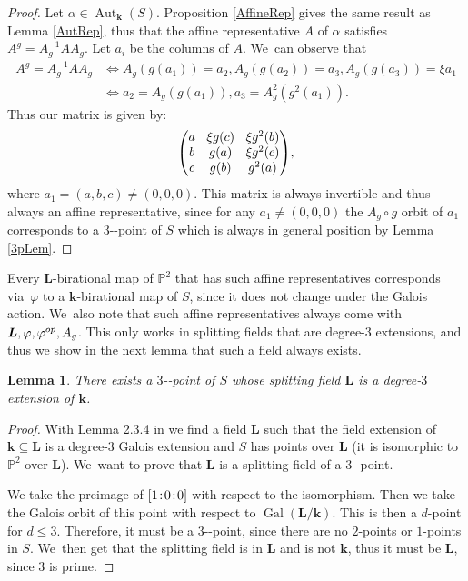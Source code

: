 \documentclass[10pt,a4paper]{amsart}
\providecommand{\nobreakdash}{\nobreak\hbox{-}}
\newcommand{\op}{\textup{op}}
\newcommand{\sep}{\mkern2mu{:}\mkern2mu}
\DeclareMathOperator{\Gal}{Gal}
\newtheorem{lemma}[theorem]{Lemma}
\theoremstyle{definition}
\newcommand{\kk}{{\boldsymbol{k}}}
\newcommand{\LL}{{\boldsymbol{L}}}
\DeclareMathOperator{\Aut}{Aut}
\begin{document}
\begin{proof}
Let $\alpha \in \Aut_{\kk}(S)$. Proposition \ref{AffineRep} gives the same result as Lemma \ref{AutRep}, thus that the affine representative $A$ of $\alpha$ satisfies $A^g = A_g^{-1} A A_g$. Let $a_i$ be the columns of $A$. We~can observe that
\begin{align*}
A^g = A_g^{-1} A A_g &\iff A_g(g(a_1)) = a_2, A_g(g(a_2)) = a_3, A_g(g(a_3)) = \xi a_1
\\
&\iff a_2 = A_g(g(a_1)), a_3 = A_g^2(g^2(a_1)).
\end{align*}
Thus our matrix is given by:
\begin{equation*}\arraycolsep4.5pt
\begin{pmatrix}
a & \xi g(c) & \xi g^2(b) \\
b & g(a) & \xi g^2(c) \\
c & g(b) & g^2(a)
\end{pmatrix}\!,
\end{equation*}
where $a_1 = (a,b,c) \neq (0,0,0)$. This matrix is always invertible and thus always an affine representative, since for any $a_1 \neq (0,0,0)$ the $A_g \circ g$ orbit of $a_1$ corresponds to a $3$\nobreakdash-point of $S$ which is always in general position by Lemma \ref{3pLem}.
\end{proof}
Every $\LL$-birational map of $\mathbb{P}^2$ that has such affine representatives corresponds via~$\varphi$ to a $\kk$-birational map of $S$, since it does not change under the Galois action. We~also note that such affine representatives always come with $\LL,\varphi, \varphi^{\op}, A_g$. This only works in splitting fields that are degree-$3$ extensions, and thus we show in the next lemma that such a field always exists.

\begin{lemma} \label{lem: goodSplit}
There exists a $3$\nobreakdash-point of $S$ whose splitting field $\LL$ is a degree-$3$ extension of $\kk$.
\end{lemma}

\begin{proof}
With Lemma 2.3.4 in \cite{BSY} we find a field $\LL$ such that the field extension of $\kk \subseteq \LL$ is a degree-$3$ Galois extension and $S$ has points over $\LL$ (it is isomorphic to~$\mathbb{P}^2$ over $\LL$). We~want to prove that $\LL$ is a splitting field of a $3$\nobreakdash-point.

We take the preimage of $[1\sep 0\sep 0]$ with respect to the isomorphism. Then we take the Galois orbit of this point with respect to $\Gal(\LL/\kk)$. This is then a $d$-point for $d \leq 3$. Therefore, it must be a $3$\nobreakdash-point, since there are no $2$-points or $1$-points in $S$. We~then get that the splitting field is in $\LL$ and is not $\kk$, thus it must be $\LL$, since $3$ is prime.
\end{proof}
\end{document}
